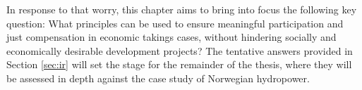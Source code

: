 %
%

In response to that worry, this chapter aims to  bring into focus the following key question: What principles can be used to ensure meaningful participation and just compensation in economic takings cases, without hindering socially and economically desirable development projects? The tentative answers provided in Section \ref{sec:ir} will set the stage for the remainder of the thesis, where they will be assessed in depth against the case study of Norwegian hydropower.


